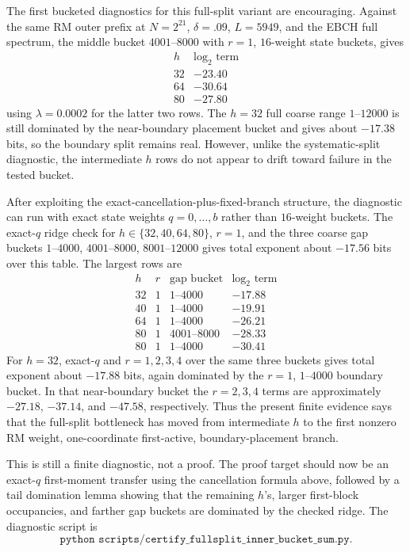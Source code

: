 The first bucketed diagnostics for this full-split variant are encouraging.  Against the same RM outer prefix at
\(N=2^{21}\), \(\delta=.09\), \(L=5949\), and the EBCH full spectrum, the middle bucket
\(4001\text{--}8000\) with \(r=1\), \(16\)-weight state buckets, gives
\[
\begin{array}{c|c}
h & \log_2\text{ term}\\
\hline
32 & -23.40\\
64 & -30.64\\
80 & -27.80
\end{array}
\]
using \(\lambda=0.0002\) for the latter two rows.  The \(h=32\) full coarse range \(1\text{--}12000\) is still
dominated by the near-boundary placement bucket and gives about \(-17.38\) bits, so the boundary split remains real.
However, unlike the systematic-split diagnostic, the intermediate \(h\) rows do not appear to drift toward failure in
the tested bucket.

After exploiting the exact-cancellation-plus-fixed-branch structure, the diagnostic can run with exact state weights
\(q=0,\ldots,b\) rather than \(16\)-weight buckets.  The exact-\(q\) ridge check for
\(h\in\{32,40,64,80\}\), \(r=1\), and the three coarse gap buckets
\(1\text{--}4000\), \(4001\text{--}8000\), \(8001\text{--}12000\) gives total exponent about \(-17.56\) bits over
this table.  The largest rows are
\[
\begin{array}{c|c|c|c}
h & r & \text{gap bucket} & \log_2\text{ term}\\
\hline
32 & 1 & 1\text{--}4000 & -17.88\\
40 & 1 & 1\text{--}4000 & -19.91\\
64 & 1 & 1\text{--}4000 & -26.21\\
80 & 1 & 4001\text{--}8000 & -28.33\\
80 & 1 & 1\text{--}4000 & -30.41
\end{array}
\]
For \(h=32\), exact-\(q\) and \(r=1,2,3,4\) over the same three buckets gives total exponent about \(-17.88\) bits,
again dominated by the \(r=1\), \(1\text{--}4000\) boundary bucket.  In that near-boundary bucket the \(r=2,3,4\)
terms are approximately \(-27.18\), \(-37.14\), and \(-47.58\), respectively.  Thus the present finite evidence says
that the full-split bottleneck has moved from intermediate \(h\) to the first nonzero RM weight, one-coordinate
first-active, boundary-placement branch.

This is still a finite diagnostic, not a proof.  The proof target should now be an exact-\(q\) first-moment transfer
using the cancellation formula above, followed by a tail domination lemma showing that the remaining \(h\)'s, larger
first-block occupancies, and farther gap buckets are dominated by the checked ridge.  The diagnostic script is
\[
\texttt{python scripts/certify\_fullsplit\_inner\_bucket\_sum.py}.
\]

